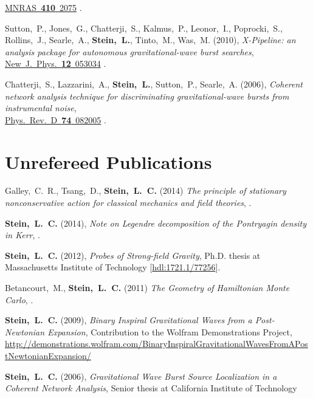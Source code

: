 \begin{etaremune}[start=\value{pubCounter}]
  \href{http://dx.doi.org/10.1111/j.1365-2966.2010.17587.x}{MNRAS~{\bf 410}~2075}
  .
\item
  Sutton,~P., Jones,~G., Chatterji,~S., Kalmus,~P., Leonor,~I.,
  Poprocki,~S., Rollins,~J., Searle,~A., {\bf Stein,~L.}, Tinto,~M.,
  Was,~M.
  (2010),
  {\it X-Pipeline: an analysis package for autonomous
    gravitational-wave burst searches},
  \href{http://dx.doi.org/10.1088/1367-2630/12/5/053034}{New~J.~Phys.~{\bf 12}~053034}
  .
\item
  Chatterji,~S., Lazzarini,~A., {\bf Stein,~L.}, Sutton,~P.,
  Searle,~A.
  (2006),
  {\it Coherent network analysis technique for
    discriminating gravitational-wave bursts from instrumental noise},\\
  \href{http://dx.doi.org/10.1103/PhysRevD.74.082005}{Phys.~Rev.~D~{\bf 74}~082005}
  .
  \setcounter{pubCounter}{\value{enumi}}
\end{etaremune}

\section{\sc Unrefereed Publications}
\addtocounter{pubCounter}{-1}
\begin{etaremune}[start=\value{pubCounter}]
\item
  Galley,~C.~R., Tsang,~D., {\bf Stein,~L.~C.}
  (2014)
  {\it The principle of stationary nonconservative action for
    classical mechanics and field theories},
  .
\item
  {\bf Stein,~L.~C.}
  (2014),
  {\it Note on Legendre decomposition of the Pontryagin density in Kerr},
  .
\item
  {\bf Stein,~L.~C.}
  (2012),
  {\it Probes of Strong-field Gravity}, Ph.D. thesis at Massachusetts
  Institute of Technology
  [\href{http://hdl.handle.net/1721.1/77256}{hdl:1721.1/77256}].
\item
  Betancourt,~M., {\bf Stein,~L.~C.}
  (2011)
  {\it The Geometry of Hamiltonian Monte Carlo},
  .
\item
  {\bf Stein,~L.~C.}
  (2009),
  {\it Binary Inspiral Gravitational Waves from a Post-Newtonian Expansion},
  Contribution to the Wolfram Demonstrations Project,
  \url{http://demonstrations.wolfram.com/BinaryInspiralGravitationalWavesFromAPostNewtonianExpansion/}
\item
  {\bf Stein,~L.~C.}
  (2006),
  {\it Gravitational Wave Burst Source Localization in a Coherent
    Network Analysis},
  Senior thesis at California Institute of Technology
\end{etaremune}


